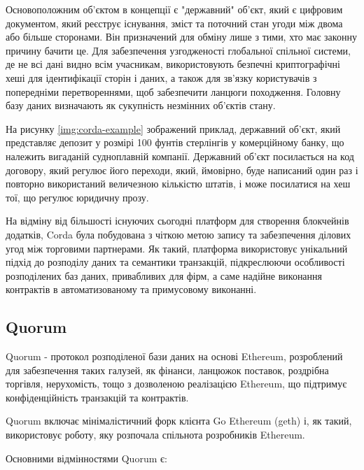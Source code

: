 \documentclass{lib/styles/default-style}
\begin{document}
    Основоположним об'єктом в концепції є "державний" об'єкт, який є цифровим документом,
    який реєструє існування, зміст та поточний стан угоди між двома або більше сторонами.
    Він призначений для обміну лише з тими, хто має законну причину бачити це.
    Для забезпечення узгодженості глобальної спільної системи, де не всі дані видно всім учасникам,
    використовують безпечні криптографічні хеші для ідентифікації сторін і даних, а також для зв’язку користувачів з попередніми перетвореннями,
    щоб забезпечити ланцюги походження. Головну базу даних визначають як сукупність незмінних об'єктів стану.

    На рисунку \ref{img:corda-example} зображений приклад, державний об'єкт,
    який представляє депозит у розмірі 100 фунтів стерлінгів у комерційному банку,
    що належить вигаданій судноплавній компанії.
    Державний об'єкт посилається на код договору,
    який регулює його переходи, який, ймовірно,
    буде написаний один раз і повторно використаний величезною кількістю штатів, і може посилатися на хеш тої, що регулює юридичну прозу.


    На відміну від більшості існуючих сьогодні платформ для створення блокчейнів додатків, Corda була побудована з чіткою метою
    запису та забезпечення ділових угод між торговими партнерами.
    Як такий, платформа використовує унікальний підхід до розподілу даних та семантики транзакцій,
    підкреслюючи особливості розподілених баз даних, привабливих для фірм, а саме надійне виконання контрактів в автоматизованому
    та примусовому виконанні.

\subsection{Quorum}

    Quorum - протокол розподіленої бази даних на основі Ethereum, розроблений для забезпечення таких галузей,
    як фінанси, ланцюжок поставок, роздрібна торгівля, нерухомість, тощо з дозволеною реалізацією Ethereum,
    що підтримує конфіденційність транзакцій та контрактів.

    Quorum включає мінімалістичний форк клієнта Go Ethereum (geth) і,
    як такий, використовує роботу, яку розпочала спільнота розробників Ethereum.

    Основними відмінностями Quorum є:

\end{document}
